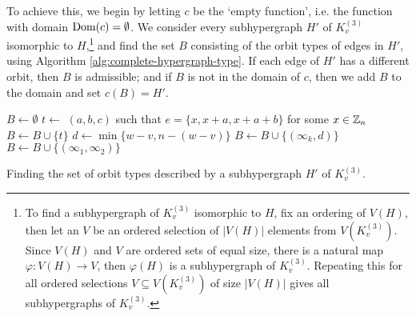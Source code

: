 To achieve this, we begin by letting $c$ be the `empty function', i.e. the function with domain $\operatorname{Dom}(c) = \emptyset$. %
We consider every subhypergraph $H'$ of $K_{v}^{(3)}$ isomorphic to
$H$,\footnote{To find a subhypergraph of $K_{v}^{(3)}$ isomorphic to $H$, fix an ordering of $V(H)$, then let an $V$ be an ordered selection of $|V(H)|$ elements from $V(K_{v}^{(3)})$. Since $V(H)$ and $V$ are ordered sets of equal size, there is a natural map $\varphi: V(H) \to V$, then $\varphi(H)$ is a subhypergraph of $K_{v}^{(3)}$. Repeating this for all ordered selections $V \subseteq V(K_{v}^{(3)})$ of size $|V(H)|$ gives all subhypergraphs of $K_{v}^{(3)}$.}
and find the set $B$ consisting of the orbit types of edges in $H'$, using Algorithm \ref{alg:complete-hypergraph-type}.
If each edge of $H'$ has a different orbit, then $B$ is admissible; and if $B$ is not in the domain of $c$, then we add $B$ to the domain and set $c(B) = H'$.

\begin{algorithm}
$B \gets \emptyset$\;
 {
     {
        $t \gets$ $(a, b, c)$ such that $e=\{x,x+a,x+a+b\}$ for some $x \in \mathbb{Z}_n$\;
        $B \gets B \cup \{t\}$\;
    }  {
        $d \gets \min \{w-v, n-(w-v)\}$\;
        $B \gets B \cup \{(\infty_k, d)\}$ \;
    }  {
        $B \gets B \cup \{(\infty_1, \infty_2)\}$\;
    }
}
\;
\caption{Finding the set of orbit types described by a subhypergraph $H'$ of $K_{v}^{(3)}$.} \label{alg:complete-hypergraph-type}
\end{algorithm}


